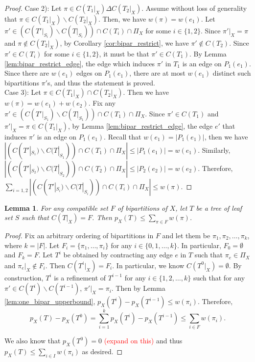 \documentclass{article}
\newcommand{\note}[1]{\textcolor{red}{#1}}
\newtheorem{lemma}{Lemma}
\begin{document}
\begin{proof}
    Case 2): Let $\pi \in C(T_1|_X) \Delta C(T_2|_X)$. Assume without loss of generality that $\pi \in C(T_1|_X) \backslash C(T_2|_X)$. Then, we have $w(\pi) = w(e_1)$. Let $\pi'\in (C(T'|_{S_i})\backslash C(T|_{S_i})) \cap C(T_i) \cap \Pi_X$ for some $i \in \{1,2\}$. Since $\pi'|_X = \pi$ and $\pi \notin C(T_2|_X)$, by Corollary \ref{cor:bipar_restrict}, we have $\pi' \notin C(T_2)$. Since $\pi' \in C(T_i)$ for some $i\in \{1,2\}$, it must be that $\pi' \in C(T_1)$. By Lemma \ref{lem:bipar_restrict_edge}, the edge which induces $\pi'$ in $T_1$ is an edge on $P_1(e_1)$. Since there are $w(e_1)$ edges on $P_1(e_1)$, there are at most $w(e_1)$ distinct such bipartitions $\pi'$s, and thus the statement is proved.\\
    
    Case 3): Let $\pi \in C(T_1|_X) \cap C(T_2|_X)$. Then we have $w(\pi) = w(e_1)+w(e_2)$. Fix any $\pi'\in (C(T'|_{S_1})\backslash C(T|_{S_1})) \cap C(T_1) \cap \Pi_X$. Since $\pi' \in C(T_1)$ and $\pi'|_X = \pi \in C(T_1|_X)$, by Lemma \ref{lem:bipar_restrict_edge}, the edge $e'$ that induces $\pi'$ is an edge on $P_1(e_1)$. Recall that $w(e_1) = |P_1(e_1)|$, then we have $|(C(T'|_{S_1})\backslash C(T|_{S_1})) \cap C(T_1) \cap \Pi_X| \le |P_1(e_1)| = w(e_1)$. Similarly, $|(C(T'|_{S_2})\backslash C(T|_{S_2})) \cap C(T_2) \cap \Pi_X| \le |P_2(e_2)| = w(e_2)$. Therefore, $\sum_{i = 1,2}|(C(T'|_{S_i})\backslash C(T|_{S_i})) \cap C(T_i) \cap \Pi_X| \le w(\pi)$.
\end{proof}


\begin{lemma} \label{lem:compatible_set_upperbound}
    For any compatible set $F$ of bipartitions of $X$, let $T$ be a tree of leaf set $S$ such that $C(T|_X) = F$. Then $p_X(T) \le \sum_{\pi \in F} w(\pi)$.
\end{lemma}
\begin{proof}
    
    Fix an arbitrary ordering of bipartitions in $F$ and let them be $\pi_1,\pi_2,\dots,\pi_k$, where $k = |F|$. Let $F_i = \{\pi_1,\dots, \pi_i\}$ for any $i \in \{0,1,\dots,k\}$. In particular, $F_0 = \emptyset$ and $F_k = F$. Let $T^i$ be obtained by contracting any edge $e$ in $T$ such that $\pi_e \in \Pi_X$ and $\pi_e|_X \notin F_i$. Then $C(T^i|_X) = F_i$. In particular, we know $C(T^0|_X) = \emptyset$. By construction, $T^i$ is a refinement of $T^{i-1}$ for any $i \in \{1,2,\dots,k\}$ such that for any $\pi' \in C(T^i)\backslash C(T^{i-1})$, $\pi'|_X = \pi_i$. Then by Lemma \ref{lem:one_bipar_upperbound}, $p_X(T^i) - p_X(T^{i-1}) \le w(\pi_i)$. Therefore, 
    \[p_X(T) - p_X(T^0) = \sum_{i = 1}^k p_X(T^i) - p_X(T^{i-1}) \le \sum_{i \in F}w(\pi_i).\]
    
    We also know that $p_X(T^0) = 0$ \note{(expand on this)} and thus $p_X(T) \le \sum_{i \in I}w(\pi_i)$ as desired.
\end{proof}
\end{document}
